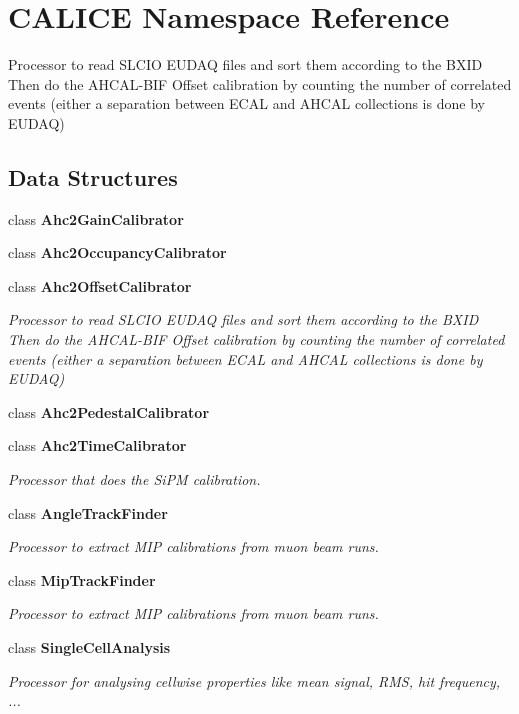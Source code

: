 \section{C\-A\-L\-I\-C\-E Namespace Reference}
\label{namespaceCALICE}


Processor to read S\-L\-C\-I\-O E\-U\-D\-A\-Q files and sort them according to the B\-X\-I\-D Then do the A\-H\-C\-A\-L-\/\-B\-I\-F Offset calibration by counting the number of correlated events (either a separation between E\-C\-A\-L and A\-H\-C\-A\-L collections is done by E\-U\-D\-A\-Q)  


\subsection*{Data Structures}
\begin{DoxyCompactItemize}
\item 
class {\bf Ahc2\-Gain\-Calibrator}
\item 
class {\bf Ahc2\-Occupancy\-Calibrator}
\item 
class {\bf Ahc2\-Offset\-Calibrator}
\begin{DoxyCompactList}\small\item\em Processor to read S\-L\-C\-I\-O E\-U\-D\-A\-Q files and sort them according to the B\-X\-I\-D Then do the A\-H\-C\-A\-L-\/\-B\-I\-F Offset calibration by counting the number of correlated events (either a separation between E\-C\-A\-L and A\-H\-C\-A\-L collections is done by E\-U\-D\-A\-Q) \end{DoxyCompactList}\item 
class {\bf Ahc2\-Pedestal\-Calibrator}
\item 
class {\bf Ahc2\-Time\-Calibrator}
\begin{DoxyCompactList}\small\item\em Processor that does the Si\-P\-M calibration. \end{DoxyCompactList}\item 
class {\bf Angle\-Track\-Finder}
\begin{DoxyCompactList}\small\item\em Processor to extract M\-I\-P calibrations from muon beam runs. \end{DoxyCompactList}\item 
class {\bf Mip\-Track\-Finder}
\begin{DoxyCompactList}\small\item\em Processor to extract M\-I\-P calibrations from muon beam runs. \end{DoxyCompactList}\item 
class {\bf Single\-Cell\-Analysis}
\begin{DoxyCompactList}\small\item\em Processor for analysing cellwise properties like mean signal, R\-M\-S, hit frequency, ... \end{DoxyCompactList}\end{DoxyCompactItemize}
